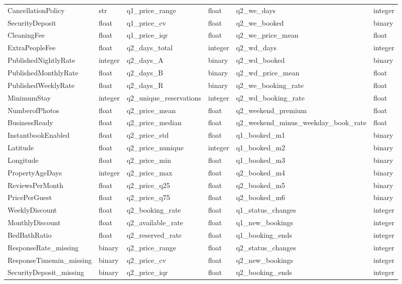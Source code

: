 \documentclass[journal]{IEEEtran}
\begin{document}
\begin{table}[!ht]
\begin{tabular}{ll|ll|ll}
CancellationPolicy & str & q1\_price\_range & float & q2\_we\_days & integer \\
SecurityDeposit & float & q1\_price\_cv & float & q2\_we\_booked & binary \\
CleaningFee & float & q1\_price\_iqr & float & q2\_we\_price\_mean & float \\
ExtraPeopleFee & float & q2\_days\_total & integer & q2\_wd\_days & integer \\
PublishedNightlyRate & integer & q2\_days\_A & binary & q2\_wd\_booked & binary \\
PublishedMonthlyRate & float & q2\_days\_B & binary & q2\_wd\_price\_mean & float \\
PublishedWeeklyRate & float & q2\_days\_R & binary & q2\_we\_booking\_rate & float \\
MinimumStay & integer & q2\_unique\_reservations & integer & q2\_wd\_booking\_rate & float \\
NumberofPhotos & float & q2\_price\_mean & float & q2\_weekend\_premium & float \\
BusinessReady & float & q2\_price\_median & float & q2\_weekend\_minus\_weekday\_book\_rate & float \\
InstantbookEnabled & float & q2\_price\_std & float & q1\_booked\_m1 & binary \\
Latitude & float & q2\_price\_nunique & integer & q1\_booked\_m2 & binary \\
Longitude & float & q2\_price\_min & float & q1\_booked\_m3 & binary \\
PropertyAgeDays & integer & q2\_price\_max & float & q2\_booked\_m4 & binary \\
ReviewsPerMonth & float & q2\_price\_q25 & float & q2\_booked\_m5 & binary \\
PricePerGuest & float & q2\_price\_q75 & float & q2\_booked\_m6 & binary \\
WeeklyDiscount & float & q2\_booking\_rate & float & q1\_status\_changes & integer \\
MonthlyDiscount & float & q2\_available\_rate & float & q1\_new\_bookings & integer \\
BedBathRatio & float & q2\_reserved\_rate & float & q1\_booking\_ends & integer \\
ResponseRate\_missing & binary & q2\_price\_range & float & q2\_status\_changes & integer \\
ResponseTimemin\_missing & binary & q2\_price\_cv & float & q2\_new\_bookings & integer \\
SecurityDeposit\_missing & binary & q2\_price\_iqr & float & q2\_booking\_ends & integer \\

\end{tabular}
\end{table}
\end{document}
